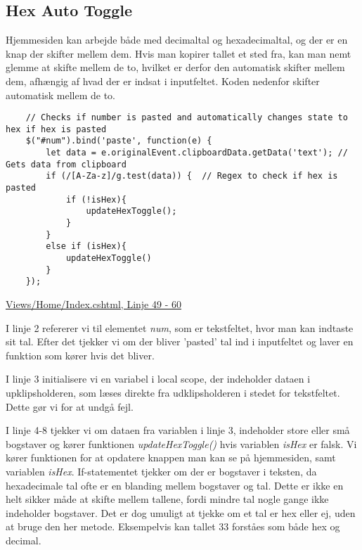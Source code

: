 \documentclass[a4paper,12pt]{extarticle}
\begin{document}
    \subsection{Hex Auto Toggle}

    Hjemmesiden kan arbejde både med decimaltal og hexadecimaltal, og der er en knap der skifter mellem dem.
    Hvis man kopirer tallet et sted fra, kan man nemt glemme at skifte mellem de to, hvilket er derfor den automatisk
    skifter mellem dem, afhængig af hvad der er indsat i inputfeltet.
    Koden nedenfor skifter automatisk mellem de to.

    \begin{listing}[!ht]
        \begin{verbatim}
    // Checks if number is pasted and automatically changes state to hex if hex is pasted
    $("#num").bind('paste', function(e) {
        let data = e.originalEvent.clipboardData.getData('text'); // Gets data from clipboard
        if (/[A-Za-z]/g.test(data)) {  // Regex to check if hex is pasted
            if (!isHex){
                updateHexToggle();
            }
        }
        else if (isHex){
            updateHexToggle()
        }
    });
        \end{verbatim}
        \caption{\protect\href{https://github.com/Zymat-dk/RSACrackstation/blob/main/Views/Home/Index.cshtml}{Views/Home/Index.cshtml, Linje 49 - 60}}
    \end{listing}

    \medskip

    I linje 2 refererer vi til elementet \emph{num}, som er tekstfeltet, hvor man kan indtaste sit tal.
    Efter det tjekker vi om der bliver 'pasted' tal ind i inputfeltet og laver en funktion som kører hvis det bliver.

    \medskip

    I linje 3 initialisere vi en variabel i local scope, der indeholder dataen i upklipsholderen, som læses direkte fra udklipsholderen i stedet for tekstfeltet.
    Dette gør vi for at undgå fejl.

    \medskip

    I linje 4-8 tjekker vi om dataen fra variablen i linje 3, indeholder store eller små bogstaver og kører funktionen \emph{updateHexToggle()} hvis variablen \emph{isHex} er falsk.
    Vi kører funktionen for at opdatere knappen man kan se på hjemmesiden, samt variablen \emph{isHex}.
    If-statementet tjekker om der er bogstaver i teksten, da hexadecimale tal ofte er en blanding mellem bogstaver og tal.
    Dette er ikke en helt sikker måde at skifte mellem tallene, fordi mindre tal nogle gange ikke indeholder bogstaver.
    Det er dog umuligt at tjekke om et tal er hex eller ej, uden at bruge den her metode. Eksempelvis kan tallet 33 forståes som både hex og decimal.
\end{document}
